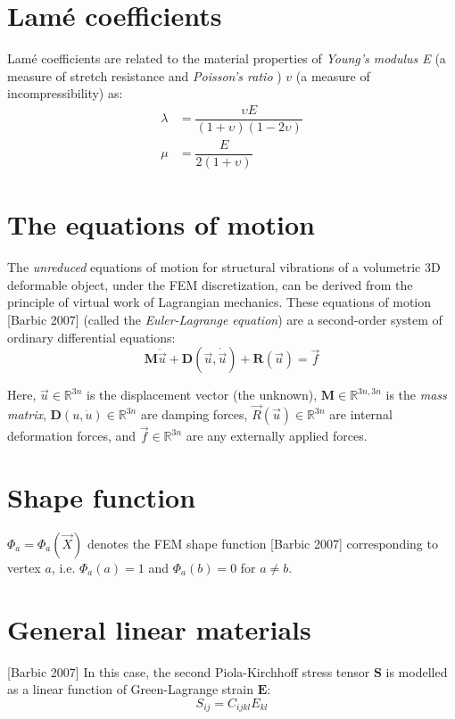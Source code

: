 \documentclass[10pt,a4paper]{article}
\begin{document}
\section{Lam\'{e} coefficients}
Lam\'{e} coefficients are related to the material properties of \textit{Young's modulus E } (a measure of stretch resistance and \textit{Poisson's ratio }) $ v $ (a measure of incompressibility) as:
\begin{align} \label{eq:lame coefficients}
\lambda &= \dfrac{\upsilon E}{(1+\upsilon)(1-2\upsilon)} \\
\mu &= \dfrac{E}{2(1+\upsilon)}
\end{align}

\section{The equations of motion}
The \textit{unreduced} equations of motion for structural vibrations of a volumetric 3D deformable object, under the FEM discretization, can be derived from the principle of virtual work of Lagrangian mechanics. These equations of motion [Barbic 2007] (called the \textit{Euler-Lagrange equation}) are a second-order system of ordinary differential equations:
\begin{equation} \label{eq: Euler-Lagrange equation}
\mathbf{M} \ddot{\vec{u}} + \mathbf{D} \left( \vec{u}, \dot{\vec{u}}\right) + \mathbf{R}\left( \vec{u} \right) = \vec{f}
\end{equation}

Here, $ \vec{u} \in \mathbb{R}^{3n} $ is the displacement vector (the unknown), $ \mathbf{M} \in \mathbb{R}^{3n,3n} $ is the \textit{mass matrix}, $ \mathbf{D}\left(u, \dot{u}\right) \in \mathbb{R}^{3n}$ are damping forces, $ \vec{R}(\vec{u}) \in \mathbb{R}^{3n} $ are internal deformation forces, and $ \vec{f} \in \mathbb{R}^{3n} $ are any externally applied forces.

\section{Shape function}
$ \Phi_a = \Phi_a (\vec{X}) $ denotes the FEM shape function [Barbic 2007] corresponding to vertex $ a $, i.e. $ \Phi_a(a) = 1 $ and $ \Phi_a(b) = 0 $ for $ a \neq b $.

\section{General linear materials}
[Barbic 2007] In this case, the second Piola-Kirchhoff stress tensor $ \mathbf{S} $ is modelled as a linear function of Green-Lagrange strain $ \mathbf{E} $:
\begin{equation}
S_{ij}  = C_{ijkl} E_{kl}
\end{equation}
\end{document}
